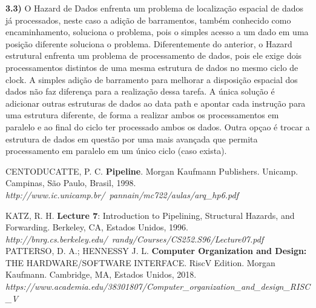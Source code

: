 \documentclass[10pt]{article}
\begin{document}
\bigskip
\bigskip
\textbf{3.3)}  O Hazard de Dados enfrenta um problema de localiza{\c c}{\~a}o espacial de dados j{\'a} processados, neste caso a adi{\c c}{\~a}o de barramentos, tamb{\'e}m conhecido como encaminhamento, soluciona o problema, pois o simples acesso a um dado em uma posi{\c c}{\~a}o diferente soluciona o problema. 
Diferentemente do anterior, o Hazard estrutural enfrenta um problema de processamento de dados, pois ele exige dois processamentos distintos de uma mesma estrutura de dados no mesmo ciclo de clock. A simples adi{\c c}{\~a}o de barramento para melhorar a disposi{\c c}{\~a}o espacial dos dados n{\~a}o faz diferen{\c c}a para a realiza{\c c}{\~a}o dessa tarefa. A {\'u}nica solu{\c c}{\~a}o {\'e} adicionar outras estruturas de dados ao data path e apontar cada instru{\c c}{\~a}o para uma estrutura diferente, de forma a realizar ambos os processamentos em paralelo e ao final do ciclo ter processado ambos os dados. Outra op{\c c}ao {\'e} trocar a estrutura de dados em quest{\~a}o por uma mais avan{\c c}ada que permita processamento em paralelo em um {\'u}nico ciclo (caso exista).

\vspace{0.6 in}

\begin{thebibliography}{9} 

 CENTODUCATTE, P. C. \textbf{Pipeline}. Morgan Kaufmann Publishers. Unicamp. Campinas, S{\~a}o Paulo, Brasil, 1998. \textit {http://www.ic.unicamp.br/~pannain/mc722/aulas/arq_hp6.pdf}

KATZ, R. H. \textbf{Lecture 7}: Introduction to Pipelining, Structural Hazards, and Forwarding. Berkeley, CA, Estados Unidos, 1996.   \textit{http://bnrg.cs.berkeley.edu/~randy/Courses/CS252.S96/Lecture07.pdf}\\

PATTERSO, D. A.; HENNESSY J. L. \textbf{Computer Organization and Design:} THE HARDWARE/SOFTWARE INTERFACE. RiscV Edition. Morgan Kaufmann. Cambridge, MA, Estados Unidos, 2018.  \textit {https://www.academia.edu/38301807/Computer_organization_and_design_RISC_V}
\end{thebibliography}
\end{document}
